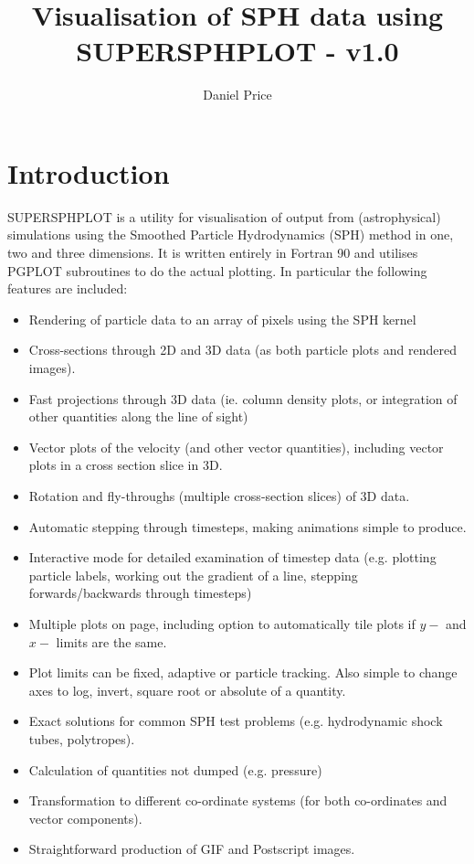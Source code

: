 \documentclass[a4paper,12pt]{article}
\title{Visualisation of SPH data using SUPERSPHPLOT - v1.0}
\author{Daniel Price}
\begin{document}
\maketitle
\tableofcontents

\newpage
\section{Introduction}
SUPERSPHPLOT is a utility for visualisation of output from (astrophysical) simulations using the
Smoothed Particle Hydrodynamics (SPH) method in one, two and three dimensions. It is written entirely in Fortran 90 and
utilises PGPLOT subroutines to do the actual plotting. In particular the following
features are included:
\begin{itemize}
\item Rendering of particle data to an array of pixels using the SPH kernel
\item Cross-sections through 2D and 3D data (as both particle plots and rendered
images).
\item Fast projections through 3D data (ie. column density plots, or integration of
other quantities along the line of sight)
\item Vector plots of the velocity (and other vector quantities), including vector
plots in a cross section slice in 3D.
\item Rotation and fly-throughs (multiple cross-section slices) of 3D data.
\item Automatic stepping through timesteps, making animations simple to produce.
\item Interactive mode for detailed examination of timestep data (e.g. plotting
particle labels, working out the gradient of a line, stepping forwards/backwards
through timesteps)
\item Multiple plots on page, including option to automatically tile plots if $y-$ and $x-$ limits
are the same.
\item Plot limits can be fixed, adaptive or particle tracking. Also simple to change
axes to log, invert, square root or absolute of a quantity.
\item Exact solutions for common SPH test problems (e.g. hydrodynamic shock tubes,
polytropes).
\item Calculation of quantities not dumped (e.g. pressure)
\item Transformation to different co-ordinate systems (for both co-ordinates and
vector components).
\item Straightforward production of GIF and Postscript images.
\end{itemize}
\end{document}
